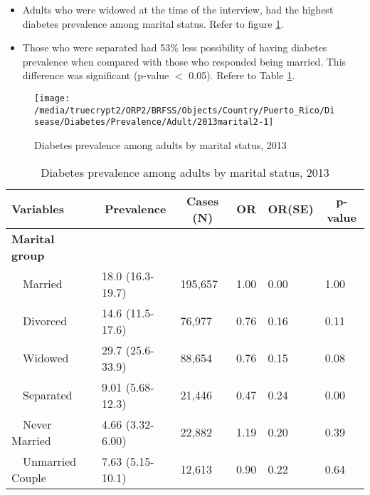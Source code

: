  \newpage
\begin{itemize}

\item Adults who were 
widowed at the time of the interview, had the highest diabetes prevalence among marital status. Refer to figure \ref{fig:marital.Diabetes.2013}.

\item Those who were separated had 53\% less possibility of having diabetes prevalence when compared with those who responded being married. This difference was significant (p-value $<$ 0.05). Refere to Table \ref{tab:marital.Diabetes.2013}.

\end{itemize}

\begin{figure}[H]
\caption{Diabetes prevalence among adults by marital status,
         2013}
\label{fig:marital.Diabetes.2013}
\begin{knitrout}
\color{fgcolor}

{\centering \texttt{[image: /media/truecrypt2/ORP2/BRFSS/Objects/Country/Puerto\_Rico/Disease/Diabetes/Prevalence/Adult/2013marital2-1]} 

}



\end{knitrout}
 \end{figure}

\begin{table}[H]
\caption{Diabetes prevalence  among adults by marital status, 2013\label{tab:marital.Diabetes.2013}} 
\begin{center}
\begin{tabular}{llllll}
\hline\hline
\multicolumn{1}{l}{Variables}&\multicolumn{1}{c}{Prevalence}&\multicolumn{1}{c}{Cases (N)}&\multicolumn{1}{c}{OR}&\multicolumn{1}{c}{OR(SE)}&\multicolumn{1}{c}{p-value}\tabularnewline
\hline
{\bfseries Marital group}&&&&&\tabularnewline
~~Married&18.0 (16.3-19.7)&195,657&1.00&0.00&1.00\tabularnewline
~~Divorced&14.6 (11.5-17.6)& 76,977&0.76&0.16&0.11\tabularnewline
~~Widowed&29.7 (25.6-33.9)& 88,654&0.76&0.15&0.08\tabularnewline
~~Separated&9.01 (5.68-12.3)& 21,446&0.47&0.24&0.00\tabularnewline
~~Never Married&4.66 (3.32-6.00)& 22,882&1.19&0.20&0.39\tabularnewline
~~Unmarried Couple&7.63 (5.15-10.1)& 12,613&0.90&0.22&0.64\tabularnewline
\hline
\end{tabular}\end{center}

\end{table}

